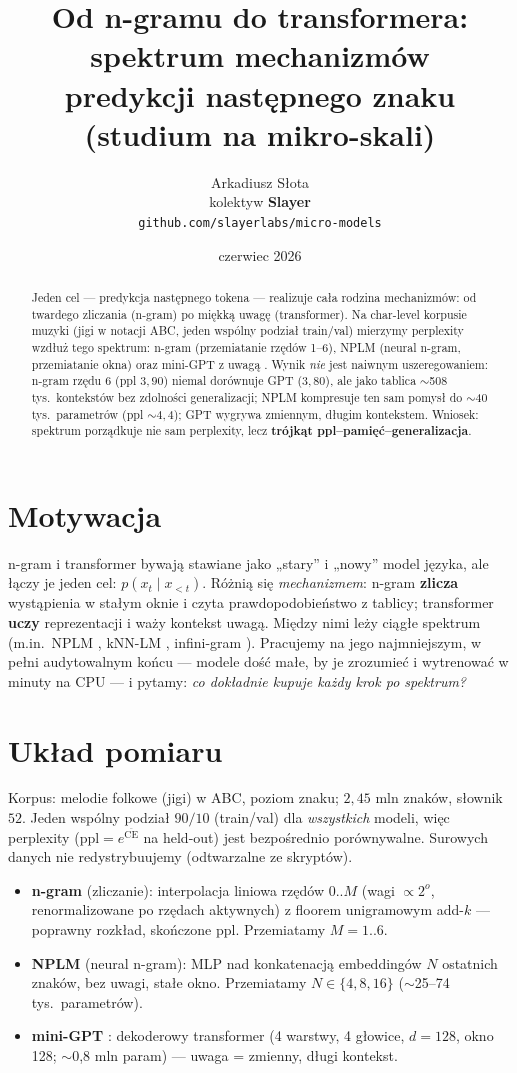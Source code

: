 \documentclass[11pt]{article}
\title{Od n-gramu do transformera: spektrum mechanizmów\\ predykcji następnego znaku (studium na mikro-skali)}
\author{Arkadiusz Słota \\ kolektyw \textbf{Slayer} \\ \texttt{github.com/slayerlabs/micro-models}}
\date{czerwiec 2026}
\begin{document}
\maketitle

\begin{abstract}
Jeden cel --- predykcja następnego tokena --- realizuje cała rodzina mechanizmów: od twardego zliczania
(n-gram) po miękką uwagę (transformer). Na char-level korpusie muzyki (jigi w notacji ABC, jeden wspólny
podział train/val) mierzymy perplexity wzdłuż tego spektrum: n-gram (przemiatanie rzędów 1--6), NPLM
\cite{nplm} (neural n-gram, przemiatanie okna) oraz mini-GPT z uwagą \cite{transformer}. Wynik \emph{nie} jest
naiwnym uszeregowaniem: n-gram rzędu 6 (ppl $3{,}90$) niemal dorównuje GPT ($3{,}80$), ale jako tablica
$\sim$508 tys.\ kontekstów bez zdolności generalizacji; NPLM kompresuje ten sam pomysł do $\sim$40 tys.\
parametrów (ppl $\sim$$4{,}4$); GPT wygrywa zmiennym, długim kontekstem. Wniosek: spektrum porządkuje nie sam
perplexity, lecz \textbf{trójkąt ppl--pamięć--generalizacja}.
\end{abstract}

\section{Motywacja}
n-gram i transformer bywają stawiane jako „stary'' i „nowy'' model języka, ale łączy je jeden cel:
$p(x_t \mid x_{<t})$. Różnią się \emph{mechanizmem}: n-gram \textbf{zlicza} wystąpienia w stałym oknie i czyta
prawdopodobieństwo z tablicy; transformer \textbf{uczy} reprezentacji i waży kontekst uwagą. Między nimi leży
ciągłe spektrum (m.in.\ NPLM \cite{nplm}, kNN-LM \cite{knnlm}, infini-gram \cite{infinigram}). Pracujemy na jego
najmniejszym, w pełni audytowalnym końcu --- modele dość małe, by je zrozumieć i wytrenować w minuty na CPU ---
i pytamy: \emph{co dokładnie kupuje każdy krok po spektrum?}

\section{Układ pomiaru}
Korpus: melodie folkowe (jigi) w ABC, poziom znaku; $2{,}45$ mln znaków, słownik $52$. Jeden wspólny podział
$90/10$ (train/val) dla \emph{wszystkich} modeli, więc perplexity ($\mathrm{ppl}=e^{\overline{\text{CE}}}$ na
held-out) jest bezpośrednio porównywalne. Surowych danych nie redystrybuujemy (odtwarzalne ze skryptów).
\begin{itemize}
  \item \textbf{n-gram} (zliczanie): interpolacja liniowa rzędów $0..M$ (wagi $\propto 2^o$, renormalizowane po
        rzędach aktywnych) z floorem unigramowym add-$k$ --- poprawny rozkład, skończone ppl. Przemiatamy $M=1..6$.
  \item \textbf{NPLM} \cite{nplm} (neural n-gram): MLP nad konkatenacją embeddingów $N$ ostatnich znaków, bez
        uwagi, stałe okno. Przemiatamy $N\in\{4,8,16\}$ ($\sim$25--74 tys.\ parametrów).
  \item \textbf{mini-GPT} \cite{transformer}: dekoderowy transformer (4 warstwy, 4 głowice, $d{=}128$, okno 128;
        $\sim$0{,}8 mln param) --- uwaga = zmienny, długi kontekst.
\end{itemize}
\end{document}
